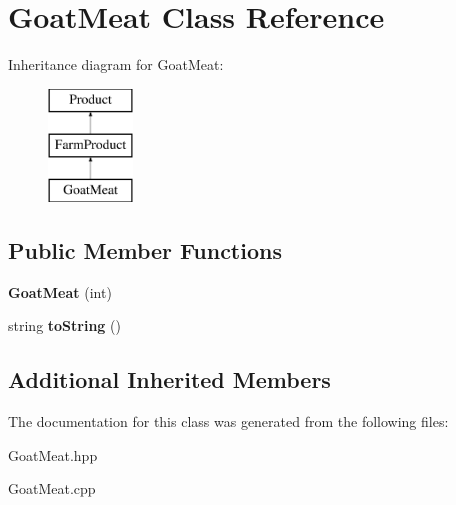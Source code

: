 \hypertarget{class_goat_meat}{}\section{Goat\+Meat Class Reference}
\label{class_goat_meat}
Inheritance diagram for Goat\+Meat\+:\begin{figure}[H]
\begin{center}
\leavevmode
\includegraphics[height=3.000000cm]{class_goat_meat}
\end{center}
\end{figure}
\subsection*{Public Member Functions}
\begin{DoxyCompactItemize}
\item 
\mbox{\label{class_goat_meat_afaac7da430315d2638d5d7bdb9a6d003}} 
{\bfseries Goat\+Meat} (int)
\item 
\mbox{\label{class_goat_meat_a84808a4954aa5f5a75c0169200c2b39a}} 
string {\bfseries to\+String} ()
\end{DoxyCompactItemize}
\subsection*{Additional Inherited Members}


The documentation for this class was generated from the following files\+:\begin{DoxyCompactItemize}
\item 
Goat\+Meat.\+hpp\item 
Goat\+Meat.\+cpp\end{DoxyCompactItemize}
